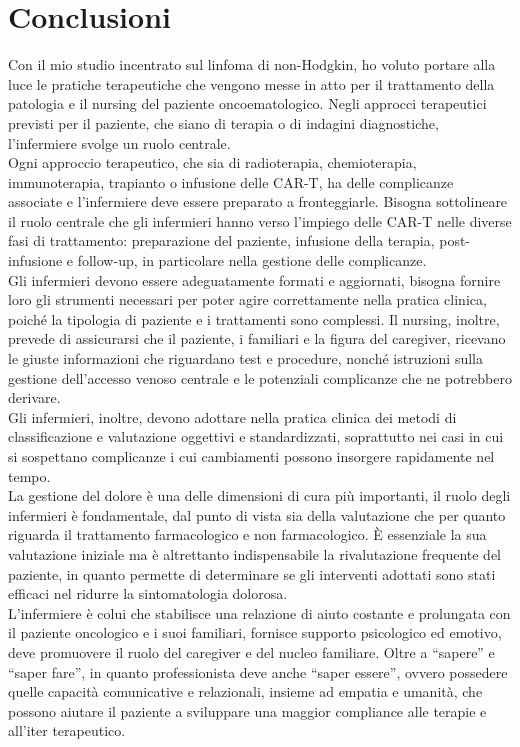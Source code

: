 \chapter*{Conclusioni}

Con il mio studio incentrato sul linfoma di non-Hodgkin, ho voluto portare alla luce le pratiche terapeutiche che vengono messe 
in atto per il trattamento della patologia e il nursing del paziente oncoematologico. Negli approcci terapeutici previsti per 
il paziente, che siano di terapia o di indagini diagnostiche, l’infermiere svolge un ruolo centrale.\\ 
Ogni approccio terapeutico, che sia di radioterapia, chemioterapia, immunoterapia, trapianto o infusione delle CAR-T, 
ha delle complicanze associate e l’infermiere deve essere preparato a fronteggiarle. Bisogna sottolineare il ruolo centrale 
che gli infermieri hanno verso l’impiego delle CAR-T nelle diverse fasi di trattamento: preparazione del paziente, infusione 
della terapia, post-infusione e follow-up, in particolare nella gestione delle complicanze.\\
Gli infermieri devono essere adeguatamente formati e aggiornati, bisogna fornire loro gli strumenti necessari per poter agire 
correttamente nella pratica clinica, poiché la tipologia di paziente e i trattamenti sono complessi. Il nursing, inoltre, 
prevede di assicurarsi che il paziente, i familiari e la figura del caregiver, ricevano le giuste informazioni che riguardano 
test e procedure, nonché istruzioni sulla gestione dell’accesso venoso centrale e le potenziali complicanze che ne potrebbero 
derivare.\\
Gli infermieri, inoltre, devono adottare nella pratica clinica dei metodi di classificazione e valutazione oggettivi e 
standardizzati, soprattutto nei casi in cui si sospettano complicanze i cui cambiamenti possono insorgere rapidamente nel tempo.\\
La gestione del dolore è una delle dimensioni di cura più importanti, il ruolo degli infermieri è fondamentale, 
dal punto di vista sia della valutazione che per quanto riguarda il trattamento farmacologico e non farmacologico. 
È essenziale la sua valutazione iniziale ma è altrettanto indispensabile la rivalutazione frequente del paziente, in quanto 
permette di determinare se gli interventi adottati sono stati efficaci nel ridurre la sintomatologia dolorosa.\\
L’infermiere è colui che stabilisce una relazione di aiuto costante e prolungata con il paziente oncologico e i suoi 
familiari, fornisce supporto psicologico ed emotivo, deve promuovere il ruolo del caregiver e del nucleo familiare. 
Oltre a “sapere” e “saper fare”, in quanto professionista deve  anche “saper essere”, ovvero possedere quelle capacità 
comunicative e relazionali, insieme ad empatia e umanità, che possono aiutare il paziente a sviluppare una maggior compliance 
alle terapie e all’iter terapeutico.


